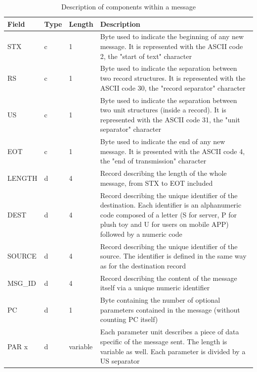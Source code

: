 \begin{table}[H]
\centering
\caption{Description of components within a message}
\label{tab:comm_message}
\begin{tabular}{|l|l|l|p{10cm}|}
\hline
\textbf{Field} & \textbf{Type} & \textbf{Length} & \textbf{Description}  \\ \hline
STX            & c             & 1               & Byte used to indicate the beginning of any new message. It is represented with the ASCII code 2, the "start of text" character \newline \\
RS             & c             & 1               & Byte used to indicate the separation between two record structures. It is represented with the ASCII code 30, the "record separator" character \newline \\
US             & c             & 1               & Byte used to indicate the separation between two unit structures (inside a record). It is represented with the ASCII code 31, the "unit separator" character \newline \\
EOT            & c             & 1               & Byte used to indicate the end of any new message. It is presented with the ASCII code 4, the "end of transmission" character \newline \\
LENGTH         & d             & 4               & Record describing the length of the whole message, from STX to EOT included \newline \\
DEST           & d             & 4               & Record describing the unique identifier of the destination. Each identifier is an alphanumeric code composed of a letter (S for server, P for plush toy and U for users on mobile APP) followed by a numeric code \newline \\
SOURCE         & d             & 4               & Record describing the unique identifier of the source. The identifier is defined in the same way as for the destination record \newline \\
MSG\_ID        & d             & 4               & Record describing the content of the message itself via a unique numeric identifier \newline \\ 
PC             & d             & 1               & Byte containing the number of optional parameters contained in the message (without counting PC itself) \newline \\
PAR x          & d             & variable        & Each parameter unit describes a piece of data specific of the message sent. The length is variable as well. Each parameter is divided by a US separator \\ \hline
\end{tabular}
\end{table}

